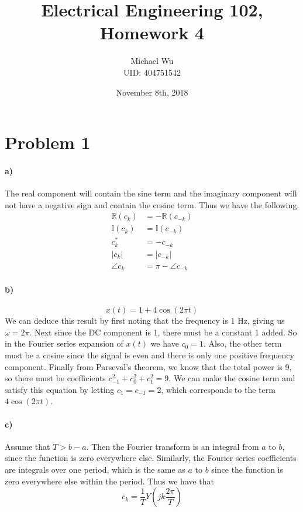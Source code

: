 \documentclass[12pt]{article}
\begin{document}
\title{Electrical Engineering 102, Homework 4}
\date{November 8th, 2018}
\author{Michael Wu\\UID: 404751542}
\maketitle

\section*{Problem 1}

\paragraph{a)}

The real component will contain the sine term and the imaginary component will not have a negative
sign and contain the cosine term. Thus we have the following.
\begin{align*}
    \mathbb{R}(c_k)&=-\mathbb{R}(c_{-k})\\
    \mathbb{I}(c_k)&=\mathbb{I}(c_{-k})\\
    c_k^*&=-c_{-k}\\
    |c_k|&=|c_{-k}|\\
    \angle c_k&=\pi-\angle c_{-k}
\end{align*}

\paragraph{b)}

\[x(t)=1+4\cos(2\pi t)\]
We can deduce this result by first noting that the frequency is \(1\) Hz, giving us \(\omega = 2\pi\).
Next since the DC component is 1, there must be a constant 1 added. So in the Fourier series expansion
of \(x(t)\) we have \(c_0=1\). Also, the other term must be a cosine since the signal is even and there is
only one positive frequency component. Finally from Parseval's theorem, we know that the total power is 9,
so there must be coefficients \(c_{-1}^2+c_0^2+c_1^2=9\). We can make the cosine term and satisfy this
equation by letting \(c_1=c_{-1}=2\), which corresponds to the term \(4\cos(2\pi t)\).

\paragraph{c)}

Assume that \(T>b-a\). Then the Fourier transform is an integral from \(a\) to \(b\), since the function is zero everywhere
else. Similarly, the Fourier series coefficients are integrals over one period, which is the same as \(a\) to \(b\) since
the function is zero everywhere else within the period. Thus we have that
\[c_k=\frac{1}{T}Y\left(jk\frac{2\pi}{T}\right)\]
\end{document}
